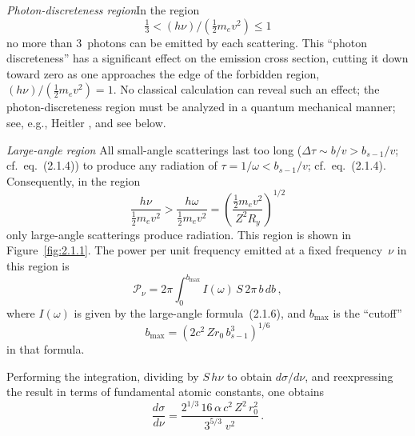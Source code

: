 \bigskip
\noindent\textit{Photon-discreteness region}\quad In the region
\begin{equation}
  \tfrac{1}{3} < (h\nu)/(\tfrac{1}{2}m_e v^{2}) \le 1
  \tag{2.1.9b}
\end{equation}
no more than 3~photons can be emitted by each scattering.  This ``photon
discreteness'' has a significant effect on the emission cross section,
cutting it down toward zero as one approaches the edge of the forbidden
region, $(h\nu)/(\tfrac{1}{2}m_e v^{2}) = 1$.  No classical calculation
can reveal such an effect; the photon-discreteness region must be
analyzed in a quantum mechanical manner; see, e.g., Heitler
\cite{Heitler1954}, and see below.


\bigskip
\noindent\textit{Large-angle region}\quad
All small-angle scatterings last too long
($\Delta\tau \sim b/v > b_{s-1}/v$; cf.\ eq.~(2.1.4)) to produce any
radiation of $\tau = 1/\omega < b_{s-1}/v$; cf.\ eq.~(2.1.4).
Consequently, in the region
\begin{equation}
  \frac{h\nu}{\tfrac{1}{2}m_e v^{2}}
  > \frac{h\omega}{\tfrac{1}{2}m_e v^{2}}
  = \left(\frac{\tfrac{1}{2}m_e v^{2}}{Z^{2}R_y}\right)^{\!1/2}
  \tag{2.1.10}
\end{equation}
only large-angle scatterings produce radiation.  This region is shown in
Figure~\ref{fig:2.1.1}.  The power per unit frequency emitted at a fixed
frequency~$\nu$ in this region is
\begin{equation}
  \mathscr{P}_\nu
  = 2\pi \int_0^{b_{\max}} I(\omega)\,S\,2\pi\,b\,db\,,
  \tag{2.1.11a}
\end{equation}
where $I(\omega)$ is given by the large-angle formula~(2.1.6), and
$b_{\max}$ is the ``cutoff''
\begin{equation}
  b_{\max} = (2c^{2}\,Zr_0\,b_{s-1}^{3})^{1/6}
  \tag{2.1.11b}
\end{equation}
in that formula.

Performing the integration, dividing by $S\,h\nu$ to obtain
$d\sigma/d\nu$, and reexpressing the result in terms of fundamental
atomic constants, one obtains
\begin{equation}
  \frac{d\sigma}{d\nu}
  = \frac{2^{1/3}\,16\,\alpha\,c^{2}\,Z^{2}\,r_0^{2}}
         {3^{5/3}\;v^{2}}\,.
\end{equation}

